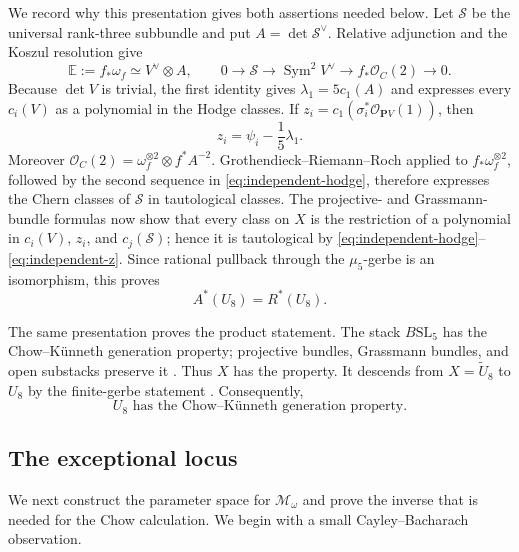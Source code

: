 \documentclass[12pt,reqno]{amsart}
\newcommand{\M}{\mathcal{M}}
\theoremstyle{definition}
\theoremstyle{remark}
\begin{document}
We record why this presentation gives both assertions needed below.  Let
$\mathcal S$ be the universal rank-three subbundle and put
$A=\det\mathcal S^\vee$.  Relative adjunction and the Koszul resolution give
\begin{equation}\label{eq:independent-hodge}
 \mathbb E:=f_*\omega_f\simeq V^\vee\otimes A,
 \qquad
 0\longrightarrow\mathcal S\longrightarrow
 \operatorname{Sym}^2V^\vee\longrightarrow
 f_*\mathcal O_C(2)\longrightarrow0.
\end{equation}
Because $\det V$ is trivial, the first identity gives
$\lambda _1=5c_1(A)$ and expresses every $c_i(V)$ as a polynomial in the
Hodge classes.  If
$z_i=c_1(\sigma_i^*\mathcal O_{\mathbf P V}(1))$, then
\begin{equation}\label{eq:independent-z}
 z_i=\psi_i-\frac{1}{5}\lambda _1.
\end{equation}
Moreover $\mathcal O_C(2)=\omega_f^{\otimes2}\otimes f^*A^{-2}$.
Grothendieck--Riemann--Roch applied to $f_*\omega_f^{\otimes2}$, followed by
the second sequence in \eqref{eq:independent-hodge}, therefore expresses the
Chern classes of $\mathcal S$ in tautological classes.  The projective- and
Grassmann-bundle formulas now show that every class on $X$ is the restriction
of a polynomial in $c_i(V)$, $z_i$, and $c_j(\mathcal S)$; hence it is
tautological by \eqref{eq:independent-hodge}--\eqref{eq:independent-z}.  Since
rational pullback through the $\mu _5$-gerbe is an isomorphism, this proves
\begin{equation}\label{eq:U8-chow}
 A^*(U_8)=R^*(U_8).
\end{equation}

The same presentation proves the product statement.  The stack
$B\mathrm{SL}_5$ has the Chow--K\"unneth generation property; projective
bundles, Grassmann bundles, and open substacks preserve it
\cite[Lemmas~3.3, 3.7, and 3.8]{CanningLarsonStable}.  Thus $X$ has the
property.  It descends from $X=\widetilde U_8$ to $U_8$ by the finite-gerbe
statement \cite[Lemma~3.6]{CanningLarsonStable}.  Consequently,
\begin{equation}\label{eq:U8-ckgp}
 U_8\text{ has the Chow--K\"unneth generation property}.
\end{equation}

\subsection{The exceptional locus}

We next construct the parameter space for $\M_\omega$ and prove the inverse
that is needed for the Chow calculation.  We begin with a small
Cayley--Bacharach observation.
\end{document}
